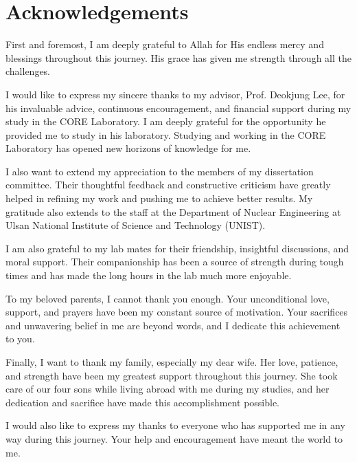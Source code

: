 \section*{\hfill \Large Acknowledgements \hfill}
First and foremost, I am deeply grateful to Allah for His endless mercy and blessings throughout this journey. His grace has given me strength through all the challenges.

I would like to express my sincere thanks to my advisor, Prof. Deokjung Lee, for his invaluable advice, continuous encouragement, and financial support during my study in the CORE Laboratory. I am deeply grateful for the opportunity he provided me to study in his laboratory. Studying and working in the CORE Laboratory has opened new horizons of knowledge for me.

I also want to extend my appreciation to the members of my dissertation committee. Their thoughtful feedback and constructive criticism have greatly helped in refining my work and pushing me to achieve better results. My gratitude also extends to the staff at the Department of Nuclear Engineering at Ulsan National Institute of Science and Technology (UNIST).

I am also grateful to my lab mates for their friendship, insightful discussions, and moral support. Their companionship has been a source of strength during tough times and has made the long hours in the lab much more enjoyable. 

To my beloved parents, I cannot thank you enough. Your unconditional love, support, and prayers have been my constant source of motivation. Your sacrifices and unwavering belief in me are beyond words, and I dedicate this achievement to you.

Finally, I want to thank my family, especially my dear wife. Her love, patience, and strength have been my greatest support throughout this journey. She took care of our four sons while living abroad with me during my studies, and her dedication and sacrifice have made this accomplishment possible.

I would also like to express my thanks to everyone who has supported me in any way during this journey. Your help and encouragement have meant the world to me.
\clearpage